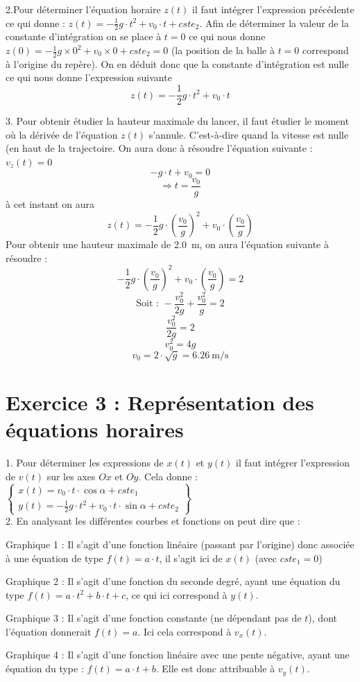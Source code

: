 \documentclass[a4paper,11pt,fleqn]{article}%
\begin{document}
2.Pour déterminer l'équation horaire $z(t)$ il faut intégrer l'expression précédente ce qui donne : $z(t) = -\frac{1}{2} g \cdot t^2 + v_0 \cdot t + cste_2$. Afin de déterminer la valeur de la constante d'intégration on se place à $t=0$ ce qui nous donne $z(0) =-\frac{1}{2} g \times 0^2 + v_0 \times 0 + cste_2 = 0$ (la position de la balle à $t=0$ correspond à l'origine du repère). On en déduit donc que la constante d'intégration est nulle ce qui nous donne l'expression suivante  $$z(t) = -\frac{1}{2} g \cdot t^2 + v_0 \cdot t$$

3. Pour obtenir étudier la hauteur maximale du lancer, il faut étudier le moment où la dérivée de l'équation $z(t)$ s'annule. C'est-à-dire quand la vitesse est nulle (en haut de la trajectoire. On aura donc à résoudre l'équation suivante : $v_z(t)=0$
$$-g\cdot t + v_0 = 0$$ $$ \Rightarrow t = \frac{v_0}{g}$$
à cet instant on aura $$z(t) = -\frac{1}{2} g \cdot (\frac{v_0}{g})^2 + v_0 \cdot (\frac{v_0}{g})$$
Pour obtenir une hauteur maximale  de \SI{2,0}{\meter}, on aura l'équation suivante à résoudre : $$-\frac{1}{2} g \cdot (\dfrac{v_0}{g})^2 + v_0 \cdot (\frac{v_0}{g})=2$$
$$ \text{Soit : }-\dfrac{v_0^2}{2g}+\dfrac{v_0^2}{g} = 2$$
$$\dfrac{v_0^2}{2g}= 2$$
$$ v_0^2 =4g$$
$$v_0 = 2 \cdot \sqrt{g} = \SI{6,26}{\meter \per \second}$$

\section*{Exercice 3 : Représentation des équations horaires}
1. Pour déterminer les expressions de $x(t)$ et $y(t)$ il faut intégrer l'expression de $v(t)$ sur les axes $Ox$ et $Oy$. Cela donne : 
$\left \lbrace \begin{array}{l}
	x(t) = v_0 \cdot t \cdot \cos{\alpha} + cste_1\\
	y(t) = - \frac{1}{2} g\cdot t^2 + v_0 \cdot t \cdot \sin{\alpha} + cste_2
\end{array}\right  \rbrace$\\

2. En analysant les différentes courbes et fonctions on peut dire que :
\begin{itemize*}
	\item Graphique 1 : Il s'agit d'une fonction linéaire (passant par l'origine) donc associée à une équation de type $f(t)= a \cdot t$, il s'agit ici de $x(t)$ (avec $cste_1 = 0$)
	\item Graphique 2 : Il s'agit d'une fonction du seconde degré, ayant une équation du type $f(t) = a \cdot t^2 + b \cdot t + c$, ce qui ici correspond à $y(t)$.
	\item Graphique 3 : Il s'agit d'une fonction constante (ne dépendant pas de $t$), dont l'équation donnerait $f(t) = a$. Ici cela correspond à $v_x(t)$.
	\item Graphique 4 : Il s'agit d'une fonction linéaire avec une pente négative, ayant une équation du type : $f(t) = a \cdot t + b$. Elle est donc attribuable à $v_y(t)$.
\end{itemize*}
\end{document}
